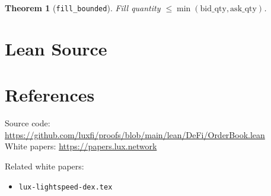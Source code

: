 \documentclass[11pt]{article}
\newtheorem{theorem}{Theorem}
\begin{document}
\begin{theorem}[\texttt{fill\_bounded}]
Fill quantity $\leq \min(\text{bid\_qty}, \text{ask\_qty})$.
\end{theorem}


\section{Lean Source}


\section{References}
\noindent Source code: \url{https://github.com/luxfi/proofs/blob/main/lean/DeFi/OrderBook.lean}\\
\noindent White papers: \url{https://papers.lux.network}

\noindent Related white papers:
\begin{itemize}
  \item \texttt{lux-lightspeed-dex.tex}
\end{itemize}
\end{document}
